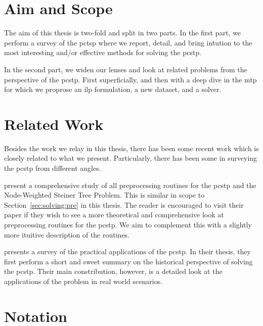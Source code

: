 \section{Aim and Scope}
The aim of this thesis is two-fold and split in two parts. In the first part, we perform a
survey of the \acrlong{pctsp} where we report, detail, and bring intution to the most interesting
and/or effective methods for solving the \gls{pcstp}.

In the second part, we widen our lenses and look at related problems from the perspective of
the \gls{pcstp}. First superficially, and then with a deep dive in the \acrlong{mtp} for which
we proprose an \gls{ilp} formulation, a new dataset, and a solver.

\section{Related Work}
Besides the work we relay in this thesis, there has been some recent work which is closely related
 to what we present. Particularly, there has been some in surveying the
\acrlong{pcstp} from different angles.

\citet*{rehfeldt2016reduction} present a comprehensive study of all preprocessing routines
for the \gls{pcstp} and the Node-Weighted Steiner Tree Problem. This is similar in scope to
Section~\ref{sec:solving:pre} in this thesis. The reader is encouraged to visit their paper
if they wish to see a more theoretical and comprehensive look at preprocessing routines for
the \gls{pcstp}. We aim to complement this with a slightly more ituitive description of the
routines.

\citet*{sun2018classical} presents a survey of the practical applications of the \gls{pcstp}.
In their thesis, they first perform a short and sweet summary on the historical perspective of
solving the \gls{pcstp}. Their main constribution, however, is a detailed look at the applications
of the problem in real world scenarios.





\section{Notation}
\label{sec:intro:notation}


